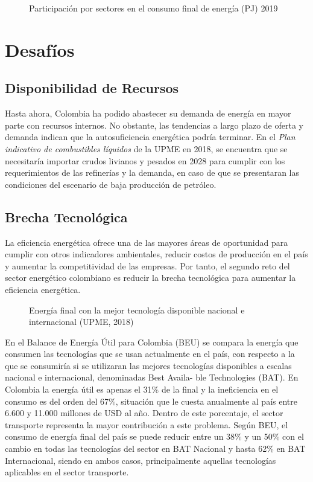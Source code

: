 \begin{figure}[htbp]
   \centering
   
    \caption{Participación por sectores en el consumo final de energía (PJ) 2019 \cite{Plan_Energetico-2050}}
    \label{fig:pn-participacion}
\end{figure}


\section{Desafíos}

\subsection{Disponibilidad de Recursos}

Hasta ahora, Colombia ha podido abastecer su demanda de energía en mayor parte con recursos internos. No obstante, las tendencias a largo plazo de oferta y demanda indican que la autosuficiencia energética podría terminar. En el \textit{Plan indicativo de combustibles líquidos} de la UPME en 2018, se encuentra que se necesitaría importar crudos livianos y pesados en 2028 para cumplir con los requerimientos de las refinerías y la demanda, en caso de que se presentaran las condiciones del escenario de baja producción de petróleo.


\subsection{Brecha Tecnológica}

La eficiencia energética ofrece una de las mayores áreas de oportunidad para cumplir con otros indicadores ambientales, reducir costos de producción en el país y aumentar la competitividad de las empresas. Por tanto, el segundo reto del sector energético colombiano es reducir la brecha tecnológica para aumentar la eficiencia energética.

 \begin{figure}[htbp]
   \centering
   
    \caption{Energía final con la mejor tecnología disponible nacional e internacional (UPME, 2018)}
    \label{fig:pn-sectores}
\end{figure}

En el Balance de Energía Útil para Colombia (BEU) se compara la energía que consumen las tecnologías que se usan actualmente en el país, con respecto a la que se consumiría si se utilizaran las mejores tecnologías disponibles a escalas nacional e internacional, denominadas Best Availa- ble Technologies (BAT). En Colombia la energía útil es apenas el 31\% de la final y la ineficiencia en el consumo es del orden del 67\%, situación que le cuesta anualmente al país entre 6.600 y 11.000 millones de USD al año. Dentro de este porcentaje, el sector transporte representa la mayor contribución a este problema. Según BEU, el consumo de energía final del país se puede reducir entre un 38\% y un 50\% con el cambio en todas las tecnologías del sector en BAT Nacional y hasta 62\% en BAT Internacional, siendo en ambos casos, principalmente aquellas tecnologías aplicables en el sector transporte.

